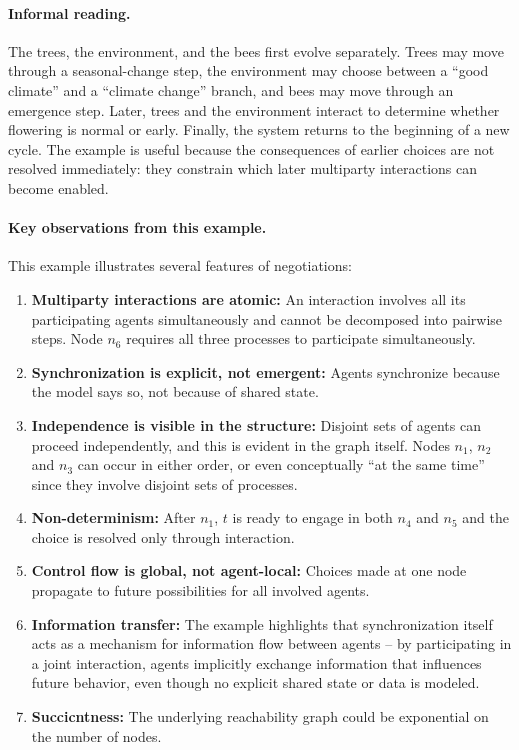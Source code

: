 \paragraph{Informal reading.}
The trees, the environment, and the bees first evolve separately. Trees may move
through a seasonal-change step, the environment may choose between a ``good
climate'' and a ``climate change'' branch, and bees may move through an
emergence step. Later, trees and the environment interact to determine whether
flowering is normal or early. Finally, the system returns to the beginning of a
new cycle. The example is useful because the consequences of earlier choices are
not resolved immediately: they constrain which later multiparty interactions can
become enabled.

\paragraph{Key observations from this example.}
This example illustrates several features of negotiations:
\begin{enumerate}
\item \textbf{Multiparty interactions are atomic:} An interaction involves all its participating agents simultaneously and cannot be decomposed into pairwise steps. Node \(n_6\) requires all three processes to participate simultaneously.
\item \textbf{Synchronization is explicit, not emergent:} Agents synchronize because the model says so, not because of shared state.
\item \textbf{Independence is visible in the structure:} Disjoint sets of agents can proceed independently, and this is evident in the graph itself. Nodes \(n_1\), \(n_2\) and \(n_3\) can occur in either order, or even conceptually ``at the same time'' since they involve disjoint sets of processes.
\item \textbf{Non-determinism:} After \(n_1\), \(t\) is ready to engage in both \(n_4\) and \(n_5\) and the choice is resolved only through interaction.
\item \textbf{Control flow is global, not agent-local:} Choices made at one node propagate to future possibilities for all involved agents.
\item \textbf{Information transfer:} The example highlights that synchronization itself acts as a mechanism for
information flow between agents -- by participating in a joint interaction, agents
implicitly exchange information that influences future behavior, even though no
explicit shared state or data is modeled.
\item \textbf{Succicntness:} The underlying reachability graph could be exponential on the number of nodes.
\end{enumerate}

